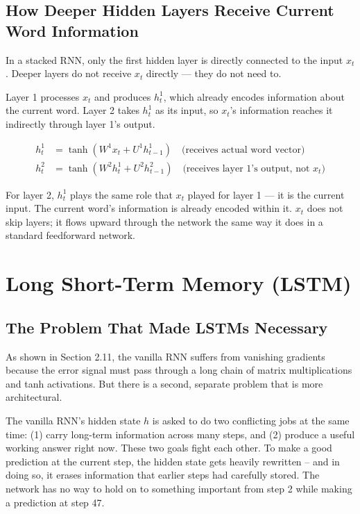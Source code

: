 \documentclass[12pt,a4paper]{article}
\begin{document}
\subsection{How Deeper Hidden Layers Receive Current Word Information}
In a stacked RNN, only the first hidden layer is directly connected to the input $x_t$. Deeper layers do not receive $x_t$ directly --- they do not need to.

Layer 1 processes $x_t$ and produces $h^1_t$, which already encodes information about the current word. Layer 2 takes $h^1_t$ as its input, so $x_t$'s information reaches it indirectly through layer 1's output.

\begin{align*}
    h^1_t &= \tanh\!\left(W^1 x_t   + U^1 h^1_{t-1}\right) \quad \text{(receives actual word vector)} \\
    h^2_t &= \tanh\!\left(W^2 h^1_t + U^2 h^2_{t-1}\right) \quad \text{(receives layer 1's output, not } x_t\text{)}
\end{align*}

For layer 2, $h^1_t$ plays the same role that $x_t$ played for layer 1 --- it is the current input. The current word's information is already encoded within it. $x_t$ does not skip layers; it flows upward through the network the same way it does in a standard feedforward network.


\section{Long Short-Term Memory (LSTM)}

\subsection{The Problem That Made LSTMs Necessary}

As shown in Section 2.11, the vanilla RNN suffers from vanishing gradients because
the error signal must pass through a long chain of matrix multiplications and tanh
activations. But there is a second, separate problem that is more architectural.

The vanilla RNN's hidden state $h$ is asked to do two conflicting jobs at the same
time: (1) carry long-term information across many steps, and (2) produce a useful
working answer right now. These two goals fight each other. To make a good prediction
at the current step, the hidden state gets heavily rewritten -- and in doing so, it
erases information that earlier steps had carefully stored. The network has no way to
hold on to something important from step 2 while making a prediction at step 47.
\end{document}
